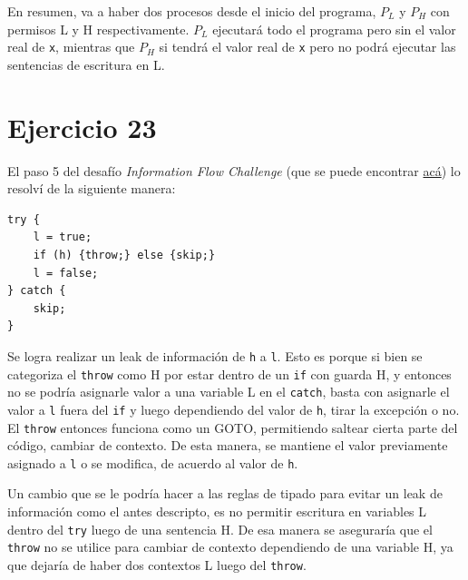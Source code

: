 \documentclass[11pt]{article}
\begin{document}
En resumen, va a haber dos procesos desde el inicio del programa, $P_L$ y $P_H$ con permisos L y H 
respectivamente. $P_L$ ejecutará todo el programa pero sin el valor real de \verb|x|, mientras que 
$P_H$ si tendrá el valor real de \verb|x| pero no podrá ejecutar las sentencias de escritura en L.

\section*{Ejercicio 23}
El paso 5 del desafío \textit{Information Flow Challenge} (que se puede encontrar  
\href{https://ifc-challenge.appspot.com/steps/allergy}{acá}) lo resolví de la siguiente manera:

\begin{verbatim}
try {
    l = true;
    if (h) {throw;} else {skip;}
    l = false;
} catch {
    skip;
}
\end{verbatim}

Se logra realizar un leak de información de \verb|h| a \verb|l|. Esto es porque si bien se categoriza 
el \verb|throw| como H por estar dentro de un \verb|if| con guarda H, y entonces no se podría 
asignarle valor a una variable L en el \verb|catch|, basta con asignarle el valor a \verb|l| fuera 
del \verb|if| y luego dependiendo del valor de \verb|h|, tirar la excepción o no. El \verb|throw| 
entonces funciona como un GOTO, permitiendo saltear cierta parte del código, cambiar de contexto. De 
esta manera, se mantiene el valor previamente asignado a \verb|l| o se modifica, de acuerdo al valor 
de \verb|h|.

Un cambio que se le podría hacer a las reglas de tipado para evitar un leak de información como el 
antes descripto, es no permitir escritura en variables L dentro del \verb|try| luego de una sentencia 
H. De esa manera se aseguraría que el \verb|throw| no se utilice para cambiar de contexto dependiendo 
de una variable H, ya que dejaría de haber dos contextos L luego del \verb|throw|.
\end{document}
